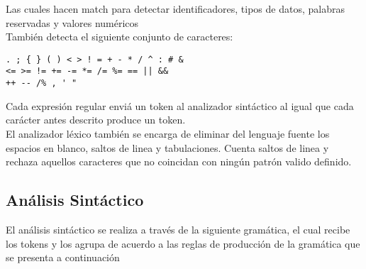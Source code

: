 \documentclass[aspectratio=169]{article}
\begin{document}
Las cuales hacen match para detectar identificadores, tipos de datos, palabras reservadas y
valores numéricos\\

También detecta el siguiente conjunto de caracteres: \\

\begin{lstlisting}
. ; { } ( ) < > ! = + - * / ^ : # &
<= >= != += -= *= /= %= == || &&
++ -- /% , ' "
\end{lstlisting}

Cada expresión regular enviá un token al analizador sintáctico al igual que cada carácter antes descrito
produce un token.\\

El analizador léxico también se encarga de eliminar del lenguaje fuente los espacios en blanco, saltos
de linea y tabulaciones. Cuenta saltos de linea y rechaza aquellos caracteres que no coincidan con ningún
patrón valido definido.


\subsection{An\'alisis Sint\'actico}

El análisis sintáctico se realiza a través de la siguiente gramática, el cual recibe los tokens
y los agrupa de acuerdo a las reglas de producción de la gramática que se presenta a continuación
\end{document}
